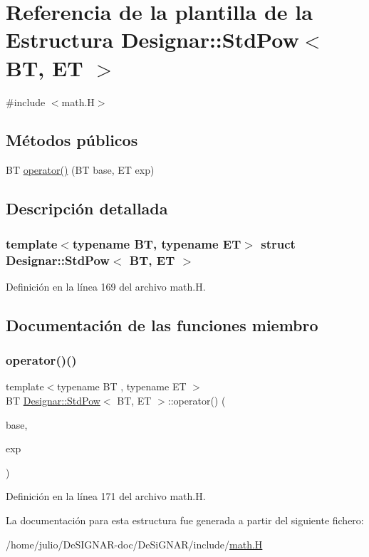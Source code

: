 \hypertarget{struct_designar_1_1_std_pow}{}\section{Referencia de la plantilla de la Estructura Designar\+:\+:Std\+Pow$<$ BT, ET $>$}
\label{struct_designar_1_1_std_pow}


{\ttfamily \#include $<$math.\+H$>$}

\subsection*{Métodos públicos}
\begin{DoxyCompactItemize}
\item 
BT \hyperlink{struct_designar_1_1_std_pow_a76ed6112976493eda665ec60c537145f}{operator()} (BT base, ET exp)
\end{DoxyCompactItemize}


\subsection{Descripción detallada}
\subsubsection*{template$<$typename BT, typename ET$>$\newline
struct Designar\+::\+Std\+Pow$<$ B\+T, E\+T $>$}



Definición en la línea 169 del archivo math.\+H.



\subsection{Documentación de las funciones miembro}
\mbox{\label{struct_designar_1_1_std_pow_a76ed6112976493eda665ec60c537145f}} 
\subsubsection{\texorpdfstring{operator()()}{operator()()}}
{\footnotesize\ttfamily template$<$typename BT , typename ET $>$ \\
BT \hyperlink{struct_designar_1_1_std_pow}{Designar\+::\+Std\+Pow}$<$ BT, ET $>$\+::operator() (\begin{DoxyParamCaption}\item[{BT}]{base,  }\item[{ET}]{exp }\end{DoxyParamCaption})\hspace{0.3cm}{\ttfamily [inline]}}



Definición en la línea 171 del archivo math.\+H.



La documentación para esta estructura fue generada a partir del siguiente fichero\+:\begin{DoxyCompactItemize}
\item 
/home/julio/\+De\+S\+I\+G\+N\+A\+R-\/doc/\+De\+Si\+G\+N\+A\+R/include/\hyperlink{math_8_h}{math.\+H}\end{DoxyCompactItemize}
